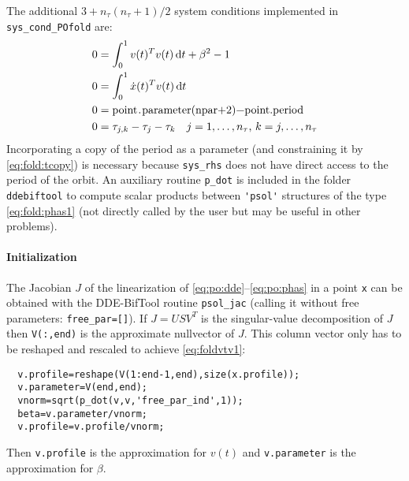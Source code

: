 \documentclass[11pt]{scrartcl}
\renewcommand{\d}{\mathop{}\!\mathrm{d}}
\newcommand{\blist}[1]{\mbox{\lstinline!#1!}}
\begin{document}
The additional $3+n_\tau(n_\tau+1)/2$ system conditions implemented in
\blist{sys_cond_POfold} are:
\begin{align}
  \label{eq:foldvtv1}
  0&=\int_0^1 v(t)^Tv(t)\d t+\beta^2-1\\
  0&=\int_0^1 \dot x(t)^Tv(t)\d t \label{eq:fold:phas1}\\
  0&=\blist{point.parameter(npar+2)-point.period} \label{eq:fold:tcopy}\\
  0&=\tau_{j,k}-\tau_j-\tau_k \mbox{\quad $j=1,\ldots,n_{\tau}$,
    $k=j,\ldots,n_{\tau}$}\label{eq:fold:taurel}
\end{align}
Incorporating a copy of the period as a parameter (and constraining it
by \eqref{eq:fold:tcopy}) is necessary because \blist{sys_rhs} does
not have direct access to the period of the orbit. An auxiliary
routine \blist{p_dot} is included in the folder
\texttt{ddebiftool} to compute scalar products between
\blist{'psol'} structures of the type \eqref{eq:fold:phas1} (not
directly called by the user but may be useful in other problems).

\paragraph{Initialization}
The Jacobian $J$ of the linearization of
\eqref{eq:po:dde}--\eqref{eq:po:phas} in a point \blist{x} can be
obtained with the DDE-BifTool routine \blist{psol_jac} (calling it
without free parameters: \blist{free_par=[]}).  If $J=USV^T$ is the
singular-value decomposition of $J$ then \blist{V(:,end)} is the
approximate nullvector of $J$. This column vector only has to be
reshaped and rescaled to achieve \eqref{eq:foldvtv1}:
\begin{lstlisting}
  v.profile=reshape(V(1:end-1,end),size(x.profile));
  v.parameter=V(end,end);
  vnorm=sqrt(p_dot(v,v,'free_par_ind',1));
  beta=v.parameter/vnorm;
  v.profile=v.profile/vnorm;
\end{lstlisting}
Then \blist{v.profile} is the approximation for $v(t)$ and
\blist{v.parameter} is the approximation for $\beta$.
\end{document}
